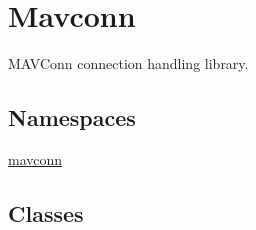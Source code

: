 \hypertarget{group__mavconn}{}\section{Mavconn}
\label{group__mavconn}


M\+A\+V\+Conn connection handling library.  


\subsection*{Namespaces}
\begin{DoxyCompactItemize}
\item 
 \mbox{\hyperlink{namespacemavconn}{mavconn}}
\end{DoxyCompactItemize}
\subsection*{Classes}
